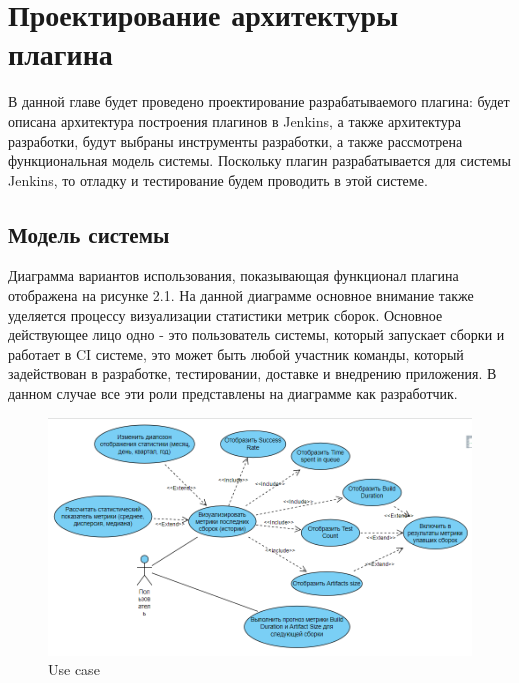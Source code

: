 \chapter{Проектирование архитектуры плагина} \label{ch2}
	
В данной главе будет проведено проектирование разрабатываемого плагина: будет описана архитектура построения плагинов в Jenkins, а также архитектура разработки, будут выбраны инструменты разработки, а также рассмотрена функциональная модель системы. Поскольку плагин разрабатывается для системы Jenkins, то отладку и тестирование будем проводить в этой системе.

\section{Модель системы} \label{ch1:sec1}

Диаграмма вариантов использования, показывающая функционал плагина отображена на рисунке 2.1. На данной диаграмме основное внимание также уделяется процессу визуализации статистики метрик сборок. Основное действующее лицо одно - это пользователь системы, который запускает сборки и работает в CI системе, это может быть любой участник команды, который задействован в разработке, тестировании, доставке и внедрению приложения. В данном случае все эти роли представлены на диаграмме как разработчик.

\begin{figure}[ht!] 
	\center
	\includegraphics [scale=0.7] {my_folder/images//usecase3}
	\caption{Use case } 
	\label{fig:usecase3}  
\end{figure}

